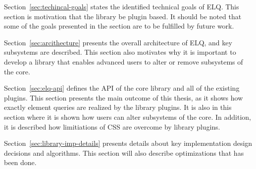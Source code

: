 \documentclass[a4paper,11pt]{kth-mag}
\begin{document}
    Section~\ref{sec:techincal-goals} states the identified technical goals of \gls{ELQ}.
    This section is motivation that the library be plugin based.
    It should be noted that some of the goals presented in the section are to be fulfilled by future work.

    Section~\ref{sec:arcithecture} presents the overall architecture of \gls{ELQ}, and key subsystems are described.
    This section also motivates why it is important to develop a library that enables advanced users to alter or remove subsystems of the core.

    Section~\ref{sec:elq-api} defines the \gls{API} of the core library and all of the existing plugins.
    This section presents the main outcome of this thesis, as it shows how exactly element queries are realized by the library plugins.
    It is also in this section where it is shown how users can alter subsystems of the core.
    In addition, it is described how limitiations of \gls{CSS} are overcome by library plugins.

    Section~\ref{sec:library-imp-details} presents details about key implementation design decisions and algorithms.
    This section will also describe optimizations that has been done.


\end{document}
